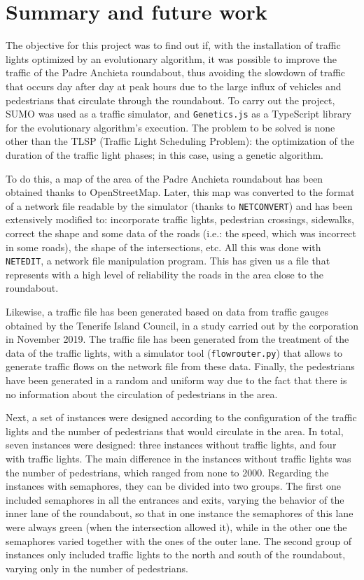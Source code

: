 \chapter{Summary and future work}
\label{cap:conclusions}

The objective for this project was to find out if, with the installation of traffic lights optimized by an evolutionary algorithm, it was possible to improve the traffic of the Padre Anchieta roundabout, thus avoiding the slowdown of traffic that occurs day after day at peak hours due to the large influx of vehicles and pedestrians that circulate through the roundabout. To carry out the project, SUMO was used as a traffic simulator, and \texttt{Genetics.js} as a TypeScript library for the evolutionary algorithm's execution. The problem to be solved is none other than the TLSP (Traffic Light Scheduling Problem): the optimization of the duration of the traffic light phases; in this case, using a genetic algorithm.

To do this, a map of the area of the Padre Anchieta roundabout has been obtained thanks to OpenStreetMap. Later, this map was converted to the format of a network file readable by the simulator (thanks to \texttt{NETCONVERT}) and has been extensively modified to: incorporate traffic lights, pedestrian crossings, sidewalks, correct the shape and some data of the roads (i.e.: the speed, which was incorrect in some roads), the shape of the intersections, etc. All this was done with \texttt{NETEDIT}, a network file manipulation program. This has given us a file that represents with a high level of reliability the roads in the area close to the roundabout. 

Likewise, a traffic file has been generated based on data from traffic gauges obtained by the Tenerife Island Council, in a study carried out by the corporation in November 2019. The traffic file has been generated from the treatment of the data of the traffic lights, with a simulator tool (\texttt{flowrouter.py}) that allows to generate traffic flows on the network file from these data. Finally, the pedestrians have been generated in a random and uniform way due to the fact that there is no information about the circulation of pedestrians in the area.

Next, a set of instances were designed according to the configuration of the traffic lights and the number of pedestrians that would circulate in the area. In total, seven instances were designed: three instances without traffic lights, and four with traffic lights. The main difference in the instances without traffic lights was the number of pedestrians, which ranged from none to 2000. Regarding the instances with semaphores, they can be divided into two groups. The first one included semaphores in all the entrances and exits, varying the behavior of the inner lane of the roundabout, so that in one instance the semaphores of this lane were always green (when the intersection allowed it), while in the other one the semaphores varied together with the ones of the outer lane. The second group of instances only included traffic lights to the north and south of the roundabout, varying only in the number of pedestrians.

